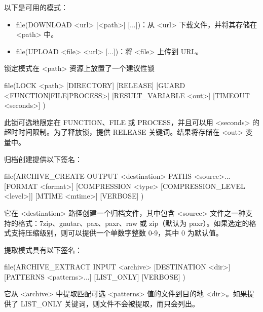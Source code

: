 
以下是可用的模式：

\begin{itemize}
\item
file(DOWNLOAD <url> [<path>] [...])：从 <url> 下载文件，并将其存储在 <path> 中。

\item
file(UPLOAD <file> <url> [...])：将 <file> 上传到 URL。
\end{itemize}


锁定模式在 <path> 资源上放置了一个建议性锁

\begin{shell}
file(LOCK <path> [DIRECTORY] [RELEASE]
    [GUARD <FUNCTION|FILE|PROCESS>]
    [RESULT_VARIABLE <out>] [TIMEOUT <seconds>]
)
\end{shell}

此锁可选地限定在 FUNCTION、FILE 或 PROCESS，并且可以用 <seconds> 的超时时间限制。为了释放锁，提供 RELEASE 关键词。结果将存储在 <out> 变量中。


归档创建提供以下签名：

\begin{shell}
file(ARCHIVE_CREATE OUTPUT <destination> PATHS <source>...
    [FORMAT <format>]
    [COMPRESSION <type> [COMPRESSION_LEVEL <level>]]
    [MTIME <mtime>] [VERBOSE]
)
\end{shell}

它在 <destination> 路径创建一个归档文件，其中包含 <source> 文件之一种支持的格式：7zip、gnutar、pax、paxr、raw 或 zip（默认为 paxr）。如果选定的格式支持压缩级别，则可以提供一个单数字整数 0-9，其中 0 为默认值。

提取模式具有以下签名：

\begin{shell}
file(ARCHIVE_EXTRACT INPUT <archive> [DESTINATION <dir>]
    [PATTERNS <patterns>...] [LIST_ONLY] [VERBOSE]
)
\end{shell}

它从 <archive> 中提取匹配可选 <patterns> 值的文件到目的地 <dir>。如果提供了 LIST\_ONLY 关键词，则文件不会被提取，而只会列出。



